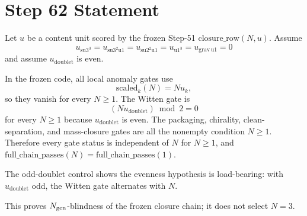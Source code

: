 \documentclass[11pt]{article}
\begin{document}
\section*{Step 62 Statement}
Let \(u\) be a content unit scored by the frozen Step-51 \(\mathrm{closure\_row}(N,u)\). Assume
\[
  u_{\mathrm{su3^3}}=u_{\mathrm{su3^2u1}}=u_{\mathrm{su2^2u1}}=u_{\mathrm{u1^3}}=u_{\mathrm{grav\,u1}}=0
\]
and assume \(u_{\mathrm{doublet}}\) is even.

In the frozen code, all local anomaly gates use
\[
  \mathrm{scaled}_k(N)=N u_k,
\]
so they vanish for every \(N\ge 1\). The Witten gate is
\[
  (N u_{\mathrm{doublet}})\bmod 2 = 0
\]
for every \(N\ge 1\) because \(u_{\mathrm{doublet}}\) is even. The packaging, chirality, clean-separation, and mass-closure gates are all the nonempty condition \(N\ge 1\). Therefore every gate status is independent of \(N\) for \(N\ge 1\), and \(\mathrm{full\_chain\_passes}(N)=\mathrm{full\_chain\_passes}(1)\).

The odd-doublet control shows the evenness hypothesis is load-bearing: with \(u_{\mathrm{doublet}}\) odd, the Witten gate alternates with \(N\).

This proves \(N_{\rm gen}\)-blindness of the frozen closure chain; it does not select \(N=3\).
\end{document}
